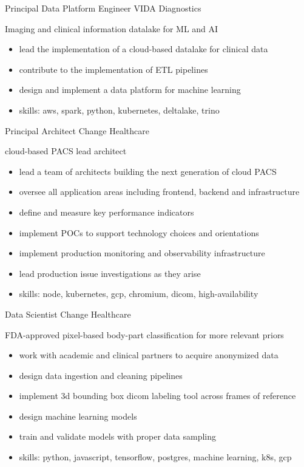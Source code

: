 \documentclass[print]{friggeri-cv}
\begin{document}
\begin{entrylist}
  {Principal Data Platform Engineer} {VIDA Diagnostics}
  {Imaging and clinical information datalake for ML and AI
  \begin{itemize}
    \item lead the implementation of a cloud-based datalake for clinical data
    \item contribute to the implementation of ETL pipelines
    \item design and implement a data platform for machine learning
    \item skills: aws, spark, python, kubernetes, deltalake, trino
  \end{itemize}}

  {Principal Architect} {Change Healthcare}
  {cloud-based PACS lead architect
  \begin{itemize}
    \item lead a team of architects building the next generation of cloud PACS
    \item oversee all application areas including frontend, backend and infrastructure
    \item define and measure key performance indicators
    \item implement POCs to support technology choices and orientations
    \item implement production monitoring and observability infrastructure
    \item lead production issue investigations as they arise
    \item skills: node, kubernetes, gcp, chromium, dicom, high-availability
  \end{itemize}}

  {Data Scientist} {Change Healthcare}
  {FDA-approved pixel-based body-part classification for more relevant priors
  \begin{itemize}
    \item work with academic and clinical partners to acquire anonymized data
    \item design data ingestion and cleaning pipelines
    \item implement 3d bounding box dicom labeling tool across frames of reference
    \item design machine learning models
    \item train and validate models with proper data sampling
    \item skills: python, javascript, tensorflow, postgres, machine learning, k8s, gcp
  \end{itemize}}

\end{entrylist}
\end{document}
